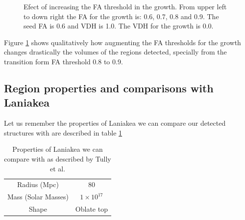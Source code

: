\documentclass[12pt]{article}
\begin{document}
\begin{figure}[ht]
\begin{minipage}{.45\textwidth}
\end{minipage}
\caption{Efect of increasing the FA threshold in the growth. From upper left to down right the FA for the growth is: 0.6, 0.7, 0.8 and 0.9. The seed FA is 0.6 and VDH is 1.0. The VDH for the growth is 0.0.} \label{fg:3D_FA_growth}
\end{figure}
\FloatBarrier

\begin{par}
 Figure \ref{fg:3D_FA_growth} shows qualitatively how augmenting the FA thresholds for the growth changes drastically the volumes of the regions detected, specially from the transition form FA threshold 0.8 to 0.9. 
\end{par}



\subsection{Region properties and comparisons with Laniakea}

\begin{par}
 Let us remember the properties of Laniakea we can compare our detected structures with are described in table \ref{tab:laniakea}
\end{par}
\begin{table}[ht]
    \centering
    \begin{tabular}{|c|c|}
        Radius (Mpc) & 80  \\
        Mass (Solar Masses) & $1 \times 10^{17}$  \\
        Shape & Oblate top
    \end{tabular}
    \caption{Properties of Laniakea we can compare with as described by Tully et al. \cite{tully_laniakea_2014}}
    \label{tab:laniakea}
\end{table}
\FloatBarrier
\end{document}
